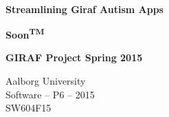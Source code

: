 
\begin{center}

	\vspace*{\fill}

	\hrulefill\newline \\

	\begin{LARGE}	
		\textbf{Streamlining Giraf Autism Apps}
	\end{LARGE}

	\vspace{0.6cm}

	\begin{Large}
		\textbf{Soon\textsuperscript{TM}}
	\end{Large}

	\vspace{1cm}

	\begin{large} 
		\textbf{GIRAF Project Spring 2015}
	\end{large}

	\hrulefill\newline

	Aalborg University		\\
	Software -- P6 -- 2015	\\
	SW604F15				\\
    
	\vspace*{\fill}

\end{center}
\thispagestyle{empty}